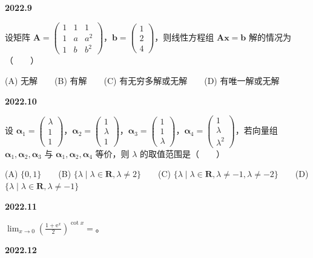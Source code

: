 \documentclass[UTF8,12pt,fontset=windows]{ctexart}
\begin{document}
\vfill
\newpage
{\large\bfseries 2022.9}

设矩阵 $\boldsymbol{A} = \begin{pmatrix} 1 & 1 & 1 \\ 1 & a & a^2 \\ 1 & b & b^2 \end{pmatrix}$，$\boldsymbol{b} = \begin{pmatrix} 1 \\ 2 \\ 4 \end{pmatrix}$，则线性方程组 $\boldsymbol{A}\boldsymbol{x} = \boldsymbol{b}$ 解的情况为（　　）

(A) 无解　　(B) 有解　　(C) 有无穷多解或无解　　(D) 有唯一解或无解

\vfill
\newpage
{\large\bfseries 2022.10}

设 $\boldsymbol{\alpha}_1 = \begin{pmatrix} \lambda \\ 1 \\ 1 \end{pmatrix}$，$\boldsymbol{\alpha}_2 = \begin{pmatrix} 1 \\ \lambda \\ 1 \end{pmatrix}$，$\boldsymbol{\alpha}_3 = \begin{pmatrix} 1 \\ 1 \\ \lambda \end{pmatrix}$，$\boldsymbol{\alpha}_4 = \begin{pmatrix} 1 \\ \lambda \\ \lambda^2 \end{pmatrix}$，若向量组 $\boldsymbol{\alpha}_1, \boldsymbol{\alpha}_2, \boldsymbol{\alpha}_3$ 与 $\boldsymbol{\alpha}_1, \boldsymbol{\alpha}_2, \boldsymbol{\alpha}_4$ 等价，则 $\lambda$ 的取值范围是（　　）

(A) $\{0, 1\}$　　(B) $\{\lambda \mid \lambda \in \boldsymbol{R}, \lambda \neq 2\}$　　(C) $\{\lambda \mid \lambda \in \boldsymbol{R}, \lambda \neq -1, \lambda \neq -2\}$　　(D) $\{\lambda \mid \lambda \in \boldsymbol{R}, \lambda \neq -1\}$

\vfill
\newpage
{\large\bfseries 2022.11}

$\lim_{x\to 0}\left(\frac{1+\mathrm{e}^x}{2}\right)^{\cot x} =$\underline{\hspace{20mm}}。

\vfill
\newpage
{\large\bfseries 2022.12}
\end{document}
